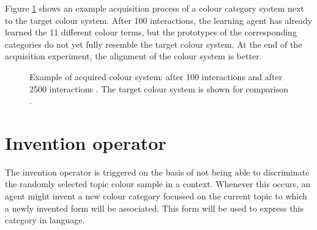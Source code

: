 Figure \ref{f:basic-strategy-acquisition-lexicon} shows an example
acquisition process of a colour category system next to the target
colour system. After 100 interactions, the learning agent has already
learned the 11 different colour terms, but the prototypes of the
corresponding categories do not yet fully resemble the target colour
system. At the end of the acquisition experiment, the alignment of the
colour system is better.

\begin{figure}[htbp]
\centering
{}
\caption[Example of an acquired and target colour system]{Example of
  acquired colour system: after 100 interactions
   and after 2500
  interactions . The target
  colour system is shown for comparison
  .}
\label{f:basic-strategy-acquisition-lexicon}
\end{figure}

\section{Invention operator}
\label{s:bcs-invention-operators}

The invention operator
is triggered on the basis of not being able
to discriminate the randomly selected topic colour sample in a
context. Whenever this occurs, an agent might invent a new colour
category focussed on the current topic to which a newly invented form
will be associated. This form will be used to express this category in
language.

